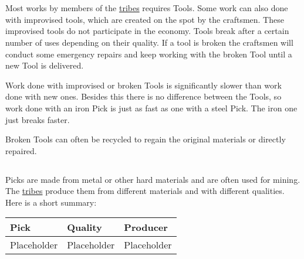\section{}\label{ch:Goods:Tools}

Most works by members of the \hyperref[ch:Tribes]{tribes} requires
\glspl{Tool}. Some work can also done with improvised tools, which are created
on the spot by the craftsmen. These improvised tools do not participate in the
economy. \Glspl{Tool} break after a certain number of uses depending on their
quality. If a tool is broken the craftsmen will conduct some emergency repairs
and keep working with the broken \gls{Tool} until a new \gls{Tool} is
delivered.

Work done with improvised or broken \glspl{Tool} is significantly slower than
work done with new ones. Besides this there is no difference between the
\glspl{Tool}, so work done with an iron \gls{Pick} is just as fast as one with
a steel \gls{Pick}. The iron one just breaks faster.

Broken \glspl{Tool} can often be recycled to regain the original materials or
directly repaired.

\subsection{}

\Glspl{Pick} are made from metal or other hard materials and are often used for mining.
The \hyperref[ch:Tribes]{tribes} produce them from different materials and with different
qualities.
Here is a short summary:

\begin{longtable}{lll}
	\toprule
	\Gls*{Pick} & Quality     & Producer    \\
	\midrule
	Placeholder & Placeholder & Placeholder \\
	\bottomrule
\end{longtable}
